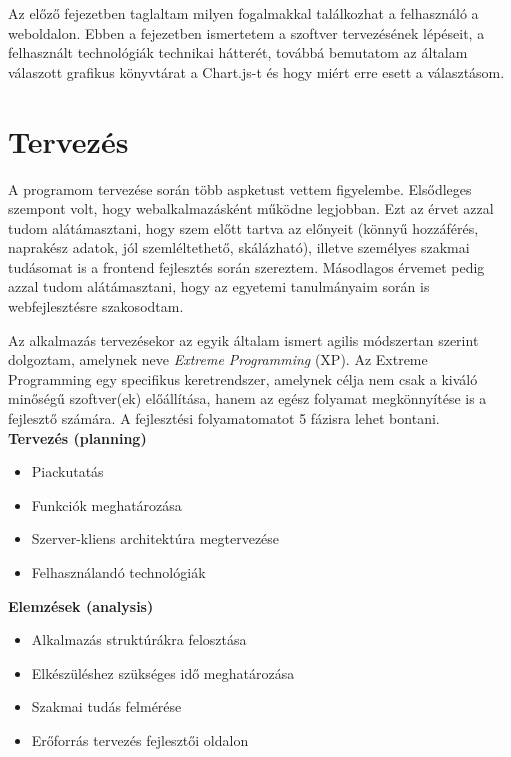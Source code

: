 
Az előző fejezetben taglaltam milyen fogalmakkal találkozhat a felhasználó a weboldalon. Ebben a fejezetben ismertetem a szoftver tervezésének lépéseit, a felhasznált technológiák technikai hátterét, továbbá bemutatom az általam válaszott grafikus könyvtárat a Chart.js-t és hogy miért erre esett a választásom.

\section{Tervezés  \label{fig:planning}}

A programom tervezése során több aspketust vettem figyelembe. Elsődleges szempont volt, hogy webalkalmazásként működne legjobban. Ezt az érvet azzal tudom alátámasztani, hogy szem előtt tartva az előnyeit (könnyű hozzáférés, naprakész adatok, jól szemléltethető, skálázható), illetve személyes szakmai tudásomat is a frontend fejlesztés során szereztem. Másodlagos érvemet pedig azzal tudom alátámasztani, hogy az egyetemi tanulmányaim során is webfejlesztésre szakosodtam.

	Az alkalmazás tervezésekor az egyik általam ismert agilis módszertan szerint dolgoztam, amelynek neve \emph{Extreme Programming} (XP). Az Extreme Programming egy specifikus keretrendszer, amelynek célja nem csak a kiváló minőségű szoftver(ek) előállítása, hanem az egész folyamat megkönnyítése is a fejlesztő számára.  A fejlesztési folyamatomatot 5 fázisra lehet bontani.\cite{agile} \\

\textbf{Tervezés (planning)}
\begin{itemize}
\item Piackutatás
\item Funkciók meghatározása
\item Szerver-kliens architektúra megtervezése
\item Felhasználandó technológiák
\end{itemize}

\textbf{Elemzések (analysis)}
\begin{itemize}
\item Alkalmazás struktúrákra felosztása
\item Elkészüléshez szükséges idő meghatározása
\item Szakmai tudás felmérése
\item Erőforrás tervezés fejlesztői oldalon
\end{itemize}

